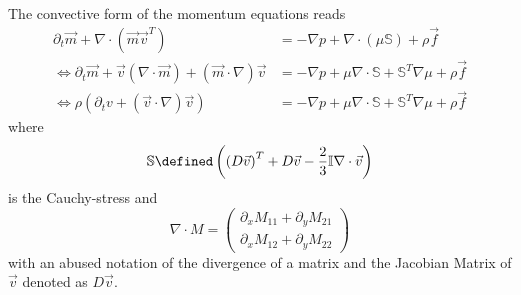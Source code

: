 
The convective form of the momentum equations reads
\begin{equation}
  \label{eq:compressible NS}
  \begin{aligned}
    \partial_t \vec{m} + \nabla \cdot (\vec{m}\vec{v}^T)
    &= - \nabla p + \nabla \cdot (\mu\mathbb{S}) + \rho \vec{f} \\
    \Leftrightarrow\partial_t \vec{m} + \vec{v}(\nabla \cdot \vec{m}) + (\vec{m} \cdot \nabla)\vec{v}
    &= - \nabla p + \mu \nabla \cdot \mathbb{S} + \mathbb{S}^T \nabla\mu + \rho \vec{f}\\
    \Leftrightarrow \rho \left(\partial_t v +  (\vec{v} \cdot \nabla)\vec{v}\right)
    &= - \nabla p + \mu \nabla \cdot \mathbb{S} + \mathbb{S}^T \nabla\mu + \rho \vec{f}
  \end{aligned}
\end{equation}
where
\begin{equation}
  \mathbb{S} \defined \left({(D\vec{v})}^T + D\vec{v} - \frac{2}{3}\mathbb{I}\nabla\cdot\vec{v} \right)
\end{equation}
is the Cauchy-stress and
\begin{equation}
  \nabla \cdot M =
  \begin{pmatrix}
    \partial_x M_{11} + \partial_y M_{21} \\
    \partial_x M_{12} + \partial_y M_{22}
  \end{pmatrix}
\end{equation}
with an abused notation of the divergence of a matrix and the Jacobian Matrix of $\vec{v}$ denoted as $D\vec{v}$.

